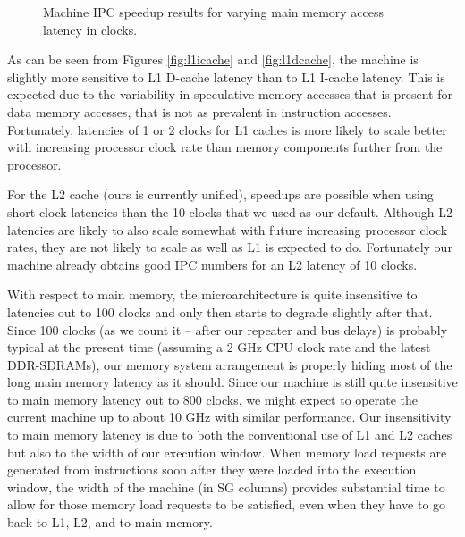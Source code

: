 \documentclass[10pt,dvips]{article}
\begin{document}
%
\begin{figure}
\centering
{}
\caption{Machine IPC speedup results for varying 
main memory access latency in clocks.}
\label{fig:dram}
\end{figure}
%
As can be seen from Figures \ref{fig:l1icache} and \ref{fig:l1dcache},
the machine is slightly more sensitive to L1 D-cache latency
than to L1 I-cache latency.  This is expected due to the
variability in speculative memory accesses that is present for 
data memory accesses,
that is not as prevalent in instruction accesses.
Fortunately, latencies of 1 or 2 clocks
for L1 caches is more likely to scale better with increasing
processor clock rate than memory components further from the processor.

For the L2 cache (ours is currently unified), speedups are
possible when using short clock latencies than the 10 clocks that
we used as our default.
Although L2 latencies are likely to also scale somewhat
with future increasing processor clock rates, they are not likely
to scale as well as L1 is expected to do.
Fortunately our machine already obtains good IPC numbers
for an L2 latency of 10 clocks. 

With respect to main memory, the microarchitecture
is quite insensitive to latencies out to 100 clocks and
only then starts to degrade slightly after that.  
Since 100 clocks
(as we count it -- after our repeater and bus delays)
is probably typical at the present time (assuming a 2 GHz
CPU clock rate and the latest DDR-SDRAMs), our memory system
arrangement is properly hiding most of the long main memory latency as it
should.  
Since our machine is still quite insensitive to
main memory latency out to 800 clocks, we might expect to
operate the current machine up to about 10 GHz with similar performance.
Our insensitivity to main memory latency is due to both the conventional
use of L1 and L2 caches but also to the width of our execution window.
When memory load requests are generated from instructions
soon after they were loaded into
the execution window, the width of the machine (in SG columns) provides
substantial time to allow for those memory load requests to
be satisfied, even when they have to go back to L1, L2, and to
main memory.
%
%
\end{document}
